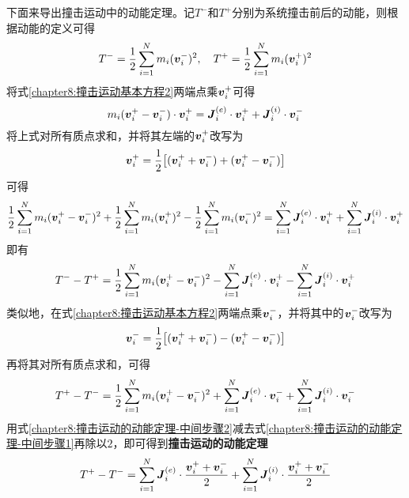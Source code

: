 下面来导出撞击运动中的动能定理。记$T^-$和$T^+$分别为系统撞击前后的动能，则根据动能的定义可得
\begin{equation}
	T^- = \frac12 \sum_{i=1}^Nm_i(\boldsymbol{v}_i^-)^2,\quad T^+ = \frac12 \sum_{i=1}^Nm_i(\boldsymbol{v}_i^+)^2
\end{equation}
将式\eqref{chapter8:撞击运动基本方程2}两端点乘$\boldsymbol{v}_i^+$可得
\begin{equation*}
	m_i(\boldsymbol{v}_i^+-\boldsymbol{v}_i^-)\cdot\boldsymbol{v}_i^+ = \boldsymbol{J}_i^{(e)}\cdot\boldsymbol{v}_i^+ + \boldsymbol{J}_i^{(i)}\cdot\boldsymbol{v}_i^-
\end{equation*}
将上式对所有质点求和，并将其左端的$\boldsymbol{v}_i^+$改写为
\begin{equation*}
	\boldsymbol{v}_i^+ = \frac12 \big[(\boldsymbol{v}_i^++\boldsymbol{v}_i^-)+(\boldsymbol{v}_i^+-\boldsymbol{v}_i^-)\big]
\end{equation*}
可得
\begin{equation*}
	\frac12 \sum_{i=1}^Nm_i(\boldsymbol{v}_i^+-\boldsymbol{v}_i^-)^2+\frac12 \sum_{i=1}^Nm_i(\boldsymbol{v}_i^+)^2-\frac12 \sum_{i=1}^Nm_i(\boldsymbol{v}_i^-)^2 = \sum_{i=1}^N\boldsymbol{J}_i^{(e)}\cdot\boldsymbol{v}_i^+ + \sum_{i=1}^N\boldsymbol{J}_i^{(i)}\cdot\boldsymbol{v}_i^+
\end{equation*}
即有
\begin{equation}
	T^--T^+ = \frac12 \sum_{i=1}^Nm_i(\boldsymbol{v}_i^+-\boldsymbol{v}_i^-)^2 - \sum_{i=1}^N\boldsymbol{J}_i^{(e)}\cdot\boldsymbol{v}_i^+ - \sum_{i=1}^N\boldsymbol{J}_i^{(i)}\cdot\boldsymbol{v}_i^+
	\label{chapter8:撞击运动的动能定理-中间步骤1}
\end{equation}
类似地，在式\eqref{chapter8:撞击运动基本方程2}两端点乘$\boldsymbol{v}_i^-$，并将其中的$\boldsymbol{v}_i^-$改写为
\begin{equation*}
	\boldsymbol{v}_i^- = \frac12 \big[(\boldsymbol{v}_i^++\boldsymbol{v}_i^-)-(\boldsymbol{v}_i^+-\boldsymbol{v}_i^-)\big]
\end{equation*}
再将其对所有质点求和，可得
\begin{equation}
	T^+-T^- = \frac12 \sum_{i=1}^Nm_i(\boldsymbol{v}_i^+-\boldsymbol{v}_i^-)^2 + \sum_{i=1}^N\boldsymbol{J}_i^{(e)}\cdot\boldsymbol{v}_i^- + \sum_{i=1}^N\boldsymbol{J}_i^{(i)}\cdot\boldsymbol{v}_i^-
	\label{chapter8:撞击运动的动能定理-中间步骤2}
\end{equation}
用式\eqref{chapter8:撞击运动的动能定理-中间步骤2}减去式\eqref{chapter8:撞击运动的动能定理-中间步骤1}再除以$2$，即可得到{\bf 撞击运动的动能定理}
\begin{equation}
	T^+-T^- = \sum_{i=1}^N\boldsymbol{J}_i^{(e)}\cdot \frac{\boldsymbol{v}_i^++\boldsymbol{v}_i^-}{2} + \sum_{i=1}^N\boldsymbol{J}_i^{(i)}\cdot \frac{\boldsymbol{v}_i^++\boldsymbol{v}_i^-}{2}
	\label{chapter8:撞击运动的动能定理}
\end{equation}

